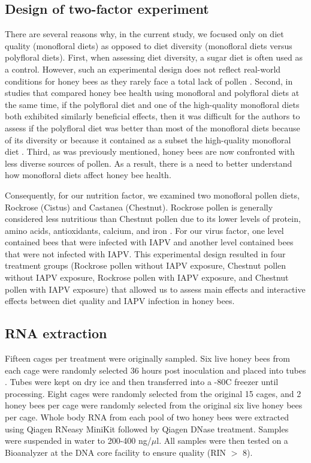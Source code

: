 \documentclass{bmcart}
\begin{document}
\begin{linenumbers}
\begin{doublespacing}
\subsection*{Design of two-factor experiment}

There are several reasons why, in the current study, we focused only on diet quality (monofloral diets) as opposed to diet diversity (monofloral diets versus polyfloral diets). First, when assessing diet diversity, a sugar diet is often used as a control. However, such an experimental design does not reflect real-world conditions for honey bees as they rarely face a total lack of pollen \cite{DiPasquale}. Second, in studies that compared honey bee health using monofloral and polyfloral diets at the same time, if the polyfloral diet and one of the high-quality monofloral diets both exhibited similarly beneficial effects, then it was difficult for the authors to assess if the polyfloral diet was better than most of the monofloral diets because of its diversity or because it contained as a subset the high-quality monofloral diet \cite{DiPasquale}. Third, as was previously mentioned, honey bees are now confronted with less diverse sources of pollen. As a result, there is a need to better understand how monofloral diets affect honey bee health.

Consequently, for our nutrition factor, we examined two monofloral pollen diets, Rockrose (Cistus) and Castanea (Chestnut). Rockrose pollen is generally considered less nutritious than Chestnut pollen due to its lower levels of protein, amino acids, antioxidants, calcium, and iron \cite{DiPasquale, adamInt}. For our virus factor, one level contained bees that were infected with IAPV and another level contained bees that were not infected with IAPV. This experimental design resulted in four treatment groups (Rockrose pollen without IAPV exposure, Chestnut pollen without IAPV exposure, Rockrose pollen with IAPV exposure, and Chestnut pollen with IAPV exposure) that allowed us to assess main effects and interactive effects between diet quality and IAPV infection in honey bees.

\subsection*{RNA extraction}

Fifteen cages per treatment were originally sampled. Six live honey bees from each cage were randomly selected 36 hours post inoculation and placed into tubes \cite{carrillo}. Tubes were kept on dry ice and then transferred into a -80C freezer until processing. Eight cages were randomly selected from the original 15 cages, and 2 honey bees per cage were randomly selected from the original six live honey bees per cage. Whole body RNA from each pool of two honey bees were extracted using Qiagen RNeasy MiniKit followed by Qiagen DNase treatment. Samples were suspended in water to 200-400 ng/$\mu$l. All samples were then tested on a Bioanalyzer at the DNA core facility to ensure quality (RIN $>$ 8).


\end{doublespacing}
\end{linenumbers}
\end{document}

